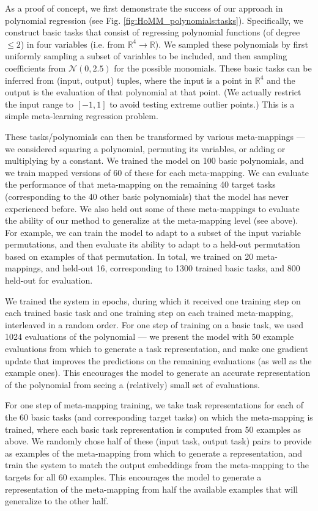 As a proof of concept, we first demonstrate the success of our approach in polynomial regression (see Fig. \ref{fig:HoMM_polynomials:tasks}). Specifically, we construct basic tasks that consist of regressing polynomial functions (of degree \(\leq 2\)) in four variables (i.e. from \(\mathbb{R}^4 \rightarrow \mathbb{R}\)). We sampled these polynomials by first uniformly sampling a subset of variables to be included, and then sampling coefficients from \(\mathcal{N}(0, 2.5)\) for the possible monomials. These basic tasks can be inferred from (input, output) tuples, where the input is a point in \(\mathbb{R}^4\) and the output is the evaluation of that polynomial at that point. (We actually restrict the input range to \([-1, 1]\) to avoid testing extreme outlier points.) This is a simple meta-learning regression problem. 

These tasks/polynomials can then be transformed by various meta-mappings --- we considered squaring a polynomial, permuting its variables, or adding or multiplying by a constant. We trained the model on 100 basic polynomials, and we train mapped versions of 60 of these for each meta-mapping. We can evaluate the performance of that meta-mapping on the remaining 40 target tasks (corresponding to the 40 other basic polynomials) that the model has never experienced before. We also held out some of these meta-mappings to evaluate the ability of our method to generalize at the meta-mapping level (see above). For example, we can train the model to adapt to a subset of the input variable permutations, and then evaluate its ability to adapt to a held-out permutation based on examples of that permutation. In total, we trained on 20 meta-mappings, and held-out 16, corresponding to 1300 trained basic tasks, and 800 held-out for evaluation. 

We trained the system in epochs, during which it received one training step on each trained basic task and one training step on each trained meta-mapping, interleaved in a random order. For one step of training on a basic task, we used 1024 evaluations of the polynomial --- we present the model with 50 example evaluations from which to generate a task representation, and make one gradient update that improves the predictions on the remaining evaluations (as well as the example ones). This encourages the model to generate an accurate representation of the polynomial from seeing a (relatively) small set of evaluations. 

For one step of meta-mapping training, we take task representations for each of the 60 basic tasks (and corresponding target tasks) on which the meta-mapping is trained, where each basic task representation is computed from 50 examples as above. We randomly chose half of these (input task, output task) pairs to provide as examples of the meta-mapping from which to generate a representation, and train the system to match the output embeddings from the meta-mapping to the targets for all 60 examples. This encourages the model to generate a representation of the meta-mapping from half the available examples that will generalize to the other half.

